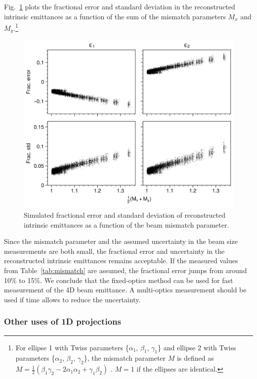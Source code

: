 Fig.~\ref{fig:mismatch} plots the fractional error and standard deviation in the reconstructed intrinsic emittances as a function of the sum of the mismatch parameters $M_x$ and $M_y$.\footnote{For ellipse 1 with Twiss parameters \{$\alpha_1$, $\beta_1$, $\gamma_1$\} and ellipse 2 with Twiss parameters \{$\alpha_2$, $\beta_2$, $\gamma_2$\}, the mismatch parameter $M$ is defined as $M = \frac{1}{2}(\beta_1\gamma_2 - 2\alpha_1\alpha_2 + \gamma_1\beta_2)$ \cite{book:Minty2003}. $M = 1$ if the ellipses are identical.} 
%
\begin{figure}[!p]
    \centering
    \includegraphics{Images/chapter4/mismatch.png}
    \caption{Simulated fractional error and standard deviation of reconstructed intrinsic emittances as a function of the beam mismatch parameter.}
    \label{fig:mismatch}
\end{figure}
%
Since the mismatch parameter and the assumed uncertainty in the beam size measurements are both small, the fractional error and uncertainty in the reconstructed intrinsic emittances remains acceptable. If the measured values from Table~\ref{tab:mismatch} are assumed, the fractional error jumps from around 10\% to 15\%. We conclude that the fixed-optics method can be used for fast measurement of the 4D beam emittance. A multi-optics measurement should be used if time allows to reduce the uncertainty.



\subsubsection{Other uses of 1D projections}

